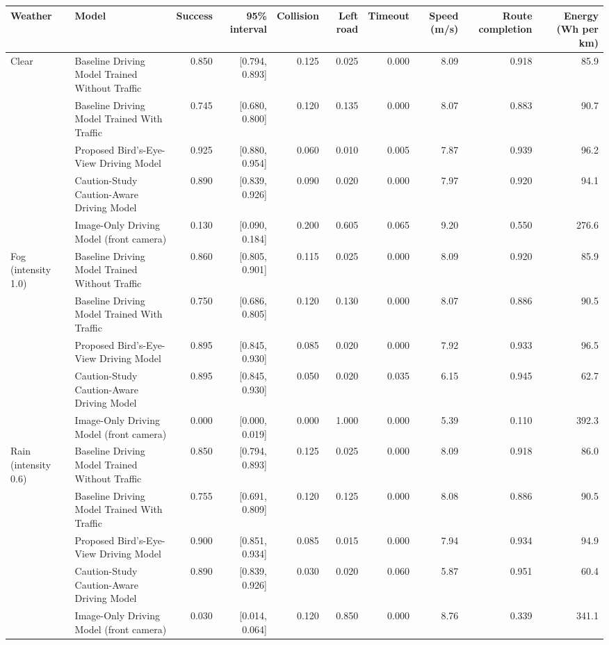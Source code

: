 \begin{tabular}{@{}llrrrrrrrr@{}}\toprule
Weather & Model & Success & 95\% interval & Collision & Left road & Timeout & Speed (m/s) & Route completion & Energy (Wh per km)\\\midrule
Clear & Baseline Driving Model Trained Without Traffic & 0.850 & [0.794, 0.893] & 0.125 & 0.025 & 0.000 & 8.09 & 0.918 & 85.9\\
 & Baseline Driving Model Trained With Traffic & 0.745 & [0.680, 0.800] & 0.120 & 0.135 & 0.000 & 8.07 & 0.883 & 90.7\\
 & Proposed Bird's-Eye-View Driving Model & 0.925 & [0.880, 0.954] & 0.060 & 0.010 & 0.005 & 7.87 & 0.939 & 96.2\\
 & Caution-Study Caution-Aware Driving Model & 0.890 & [0.839, 0.926] & 0.090 & 0.020 & 0.000 & 7.97 & 0.920 & 94.1\\
 & Image-Only Driving Model (front camera) & 0.130 & [0.090, 0.184] & 0.200 & 0.605 & 0.065 & 9.20 & 0.550 & 276.6\\
\midrule
Fog (intensity 1.0) & Baseline Driving Model Trained Without Traffic & 0.860 & [0.805, 0.901] & 0.115 & 0.025 & 0.000 & 8.09 & 0.920 & 85.9\\
 & Baseline Driving Model Trained With Traffic & 0.750 & [0.686, 0.805] & 0.120 & 0.130 & 0.000 & 8.07 & 0.886 & 90.5\\
 & Proposed Bird's-Eye-View Driving Model & 0.895 & [0.845, 0.930] & 0.085 & 0.020 & 0.000 & 7.92 & 0.933 & 96.5\\
 & Caution-Study Caution-Aware Driving Model & 0.895 & [0.845, 0.930] & 0.050 & 0.020 & 0.035 & 6.15 & 0.945 & 62.7\\
 & Image-Only Driving Model (front camera) & 0.000 & [0.000, 0.019] & 0.000 & 1.000 & 0.000 & 5.39 & 0.110 & 392.3\\
\midrule
Rain (intensity 0.6) & Baseline Driving Model Trained Without Traffic & 0.850 & [0.794, 0.893] & 0.125 & 0.025 & 0.000 & 8.09 & 0.918 & 86.0\\
 & Baseline Driving Model Trained With Traffic & 0.755 & [0.691, 0.809] & 0.120 & 0.125 & 0.000 & 8.08 & 0.886 & 90.5\\
 & Proposed Bird's-Eye-View Driving Model & 0.900 & [0.851, 0.934] & 0.085 & 0.015 & 0.000 & 7.94 & 0.934 & 94.9\\
 & Caution-Study Caution-Aware Driving Model & 0.890 & [0.839, 0.926] & 0.030 & 0.020 & 0.060 & 5.87 & 0.951 & 60.4\\
 & Image-Only Driving Model (front camera) & 0.030 & [0.014, 0.064] & 0.120 & 0.850 & 0.000 & 8.76 & 0.339 & 341.1\\

\end{tabular}
